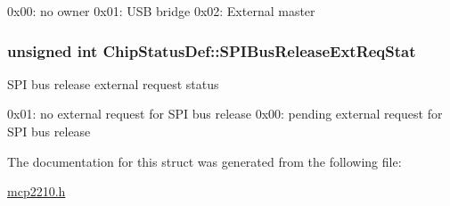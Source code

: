 0x00\-: no owner 0x01\-: \-U\-S\-B bridge 0x02\-: \-External master \hypertarget{struct_chip_status_def_ac1422f04b7345187a77b5d506dc8a492}{
\subsubsection[{\-S\-P\-I\-Bus\-Release\-Ext\-Req\-Stat}]{\setlength{\rightskip}{0pt plus 5cm}unsigned int {\bf \-Chip\-Status\-Def\-::\-S\-P\-I\-Bus\-Release\-Ext\-Req\-Stat}}}\label{struct_chip_status_def_ac1422f04b7345187a77b5d506dc8a492}
\-S\-P\-I bus release external request status

0x01\-: no external request for \-S\-P\-I bus release 0x00\-: pending external request for \-S\-P\-I bus release 

\-The documentation for this struct was generated from the following file\-:\begin{DoxyCompactItemize}
\item 
\hyperlink{mcp2210_8h}{mcp2210.\-h}\end{DoxyCompactItemize}
